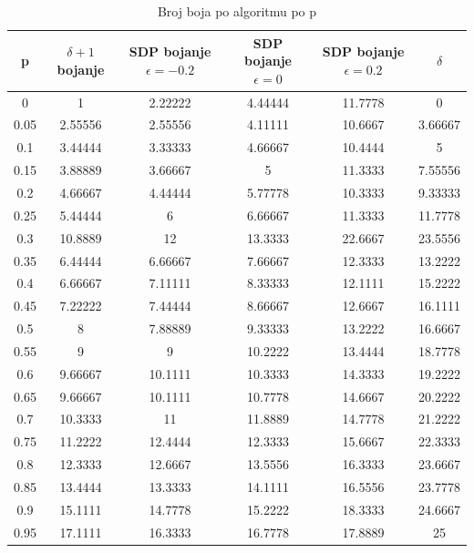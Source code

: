 \documentclass[diplomskirad]{fer}
\begin{document}
\begin{table}
  \caption{Broj boja po algoritmu po p}
  \label{table:bojanje_p}
  \begin{tabular}{|c|c|c|c|c|c|}
    \hline
    p & $\delta +1$ bojanje & SDP bojanje $\epsilon = -0.2$& SDP bojanje $\epsilon = 0$ & SDP bojanje $\epsilon = 0.2$ & $\delta$ \\
    \hline
    \hline
    0 & 1 & 2.22222 & 4.44444 & 11.7778 & 0 \\
    \hline
    0.05 & 2.55556 & 2.55556 & 4.11111 & 10.6667 & 3.66667 \\
    \hline
    0.1 & 3.44444 & 3.33333 & 4.66667 & 10.4444 & 5 \\
    \hline
    0.15 & 3.88889 & 3.66667 & 5 & 11.3333 & 7.55556 \\
    \hline
    0.2 & 4.66667 & 4.44444 & 5.77778 & 10.3333 & 9.33333 \\
    \hline
    0.25 & 5.44444 & 6 & 6.66667 & 11.3333 & 11.7778 \\
    \hline
    0.3 & 10.8889 & 12 & 13.3333 & 22.6667 & 23.5556 \\
    \hline
    0.35 & 6.44444 & 6.66667 & 7.66667 & 12.3333 & 13.2222 \\
    \hline
    0.4 & 6.66667 & 7.11111 & 8.33333 & 12.1111 & 15.2222 \\
    \hline
    0.45 & 7.22222 & 7.44444 & 8.66667 & 12.6667 & 16.1111 \\
    \hline
    0.5 & 8 & 7.88889 & 9.33333 & 13.2222 & 16.6667 \\
    \hline
    0.55 & 9 & 9 & 10.2222 & 13.4444 & 18.7778 \\
    \hline
    0.6 & 9.66667 & 10.1111 & 10.3333 & 14.3333 & 19.2222 \\
    \hline
    0.65 & 9.66667 & 10.1111 & 10.7778 & 14.6667 & 20.2222 \\
    \hline
    0.7 & 10.3333 & 11 & 11.8889 & 14.7778 & 21.2222 \\
    \hline
    0.75 & 11.2222 & 12.4444 & 12.3333 & 15.6667 & 22.3333 \\
    \hline
    0.8 & 12.3333 & 12.6667 & 13.5556 & 16.3333 & 23.6667 \\
    \hline
    0.85 & 13.4444 & 13.3333 & 14.1111 & 16.5556 & 23.7778 \\
    \hline
    0.9 & 15.1111 & 14.7778 & 15.2222 & 18.3333 & 24.6667 \\
    \hline
    0.95 & 17.1111 & 16.3333 & 16.7778 & 17.8889 & 25 \\
    \hline
  \end{tabular}
\end{table}
\end{document}

